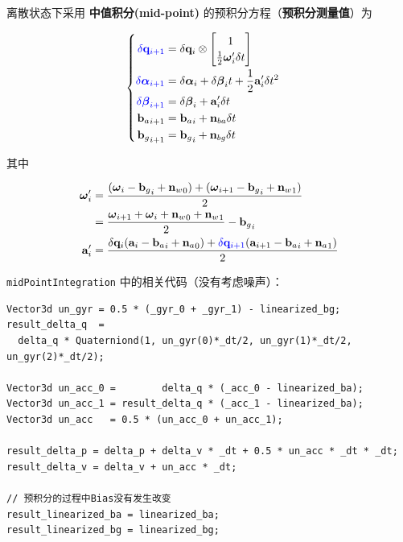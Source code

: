\documentclass[12pt,a4paper]{article}
\begin{document}
离散状态下采用 \textbf{中值积分(mid-point)} 的预积分方程（\textbf{预积分测量值}）为

\begin{equation}
\label{equ:preinte_measure}
\begin{cases}
\begin{aligned}
\color{blue}{\delta \mathbf{q}_{i+1}} &= 
\delta \mathbf{q}_{i} \otimes 
\begin{bmatrix} 1 \\ \frac{1}{2} \boldsymbol{\omega}_{i}^{\prime} \delta t \end{bmatrix} \\
\color{blue}{\delta \boldsymbol{\alpha}_{i+1}} &= 
\delta \boldsymbol{\alpha}_{i} + \delta \boldsymbol{\beta}_{i}t + \frac{1}{2} \mathbf{a}_{i}^{\prime} \delta t^{2} \\
\color{blue}{\delta \boldsymbol{\beta}_{i+1}} &= 
\delta \boldsymbol{\beta}_{i}+\mathbf{a}_{i}^{\prime} \delta t \\
{\mathbf{b}_a}_{i+1} &= {\mathbf{b}_a}_i + \mathbf{n}_{ba} \delta t \\
{\mathbf{b}_g}_{i+1} &= {\mathbf{b}_g}_i + \mathbf{n}_{bg} \delta t
\end{aligned}
\end{cases}
\end{equation}

其中

\begin{equation}
\begin{aligned}
\boldsymbol{\omega}_{i}' 
&= 
\frac{(\boldsymbol{\omega}_i-{\mathbf{b}_g}_i+{\mathbf{n}_w}_0)+(\boldsymbol{\omega}_{i+1}-{\mathbf{b}_g}_i+{\mathbf{n}_w}_1)}{2} \\
&= 
\frac{\boldsymbol{\omega}_{i+1}+\boldsymbol{\omega}_{i}+{\mathbf{n}_w}_0+{\mathbf{n}_w}_1}{2}-{\mathbf{b}_g}_i \\
\mathbf{a}_{i}' 
&= 
\frac{\delta \mathbf{q}_{i} (\mathbf{a}_{i}-{\mathbf{b}_a}_i+{\mathbf{n}_a}_0)+
{\color{blue}{\delta \mathbf{q}_{i+1}}}(\mathbf{a}_{i+1}-{\mathbf{b}_a}_i+{\mathbf{n}_a}_1)}{2}
\end{aligned}
\end{equation}

\verb|midPointIntegration| 中的相关代码（没有考虑噪声）：  

\begin{lstlisting}
Vector3d un_gyr = 0.5 * (_gyr_0 + _gyr_1) - linearized_bg;
result_delta_q  = 
  delta_q * Quaterniond(1, un_gyr(0)*_dt/2, un_gyr(1)*_dt/2, un_gyr(2)*_dt/2);

Vector3d un_acc_0 =        delta_q * (_acc_0 - linearized_ba);
Vector3d un_acc_1 = result_delta_q * (_acc_1 - linearized_ba);
Vector3d un_acc   = 0.5 * (un_acc_0 + un_acc_1);

result_delta_p = delta_p + delta_v * _dt + 0.5 * un_acc * _dt * _dt;
result_delta_v = delta_v + un_acc * _dt;

// 预积分的过程中Bias没有发生改变
result_linearized_ba = linearized_ba;
result_linearized_bg = linearized_bg;
\end{lstlisting}
\end{document}
